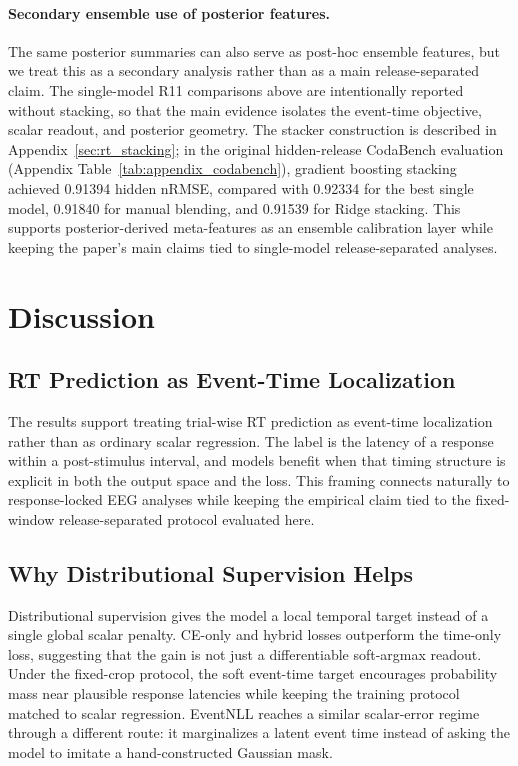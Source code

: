 \documentclass[12pt]{article}
\begin{document}
\paragraph{Secondary ensemble use of posterior features.}
The same posterior summaries can also serve as post-hoc ensemble features, but we treat this as a secondary analysis rather than as a main release-separated claim. The single-model R11 comparisons above are intentionally reported without stacking, so that the main evidence isolates the event-time objective, scalar readout, and posterior geometry. The stacker construction is described in Appendix~\ref{sec:rt_stacking}; in the original hidden-release CodaBench evaluation (Appendix Table~\ref{tab:appendix_codabench}), gradient boosting stacking achieved 0.91394 hidden nRMSE, compared with 0.92334 for the best single model, 0.91840 for manual blending, and 0.91539 for Ridge stacking. This supports posterior-derived meta-features as an ensemble calibration layer while keeping the paper's main claims tied to single-model release-separated analyses.

\section{Discussion}

\subsection{RT Prediction as Event-Time Localization}

The results support treating trial-wise RT prediction as event-time localization rather than as ordinary scalar regression. The label is the latency of a response within a post-stimulus interval, and models benefit when that timing structure is explicit in both the output space and the loss. This framing connects naturally to response-locked EEG analyses while keeping the empirical claim tied to the fixed-window release-separated protocol evaluated here.

\subsection{Why Distributional Supervision Helps}

Distributional supervision gives the model a local temporal target instead of a single global scalar penalty. CE-only and hybrid losses outperform the time-only loss, suggesting that the gain is not just a differentiable soft-argmax readout. Under the fixed-crop protocol, the soft event-time target encourages probability mass near plausible response latencies while keeping the training protocol matched to scalar regression. EventNLL reaches a similar scalar-error regime through a different route: it marginalizes a latent event time instead of asking the model to imitate a hand-constructed Gaussian mask.
\end{document}
